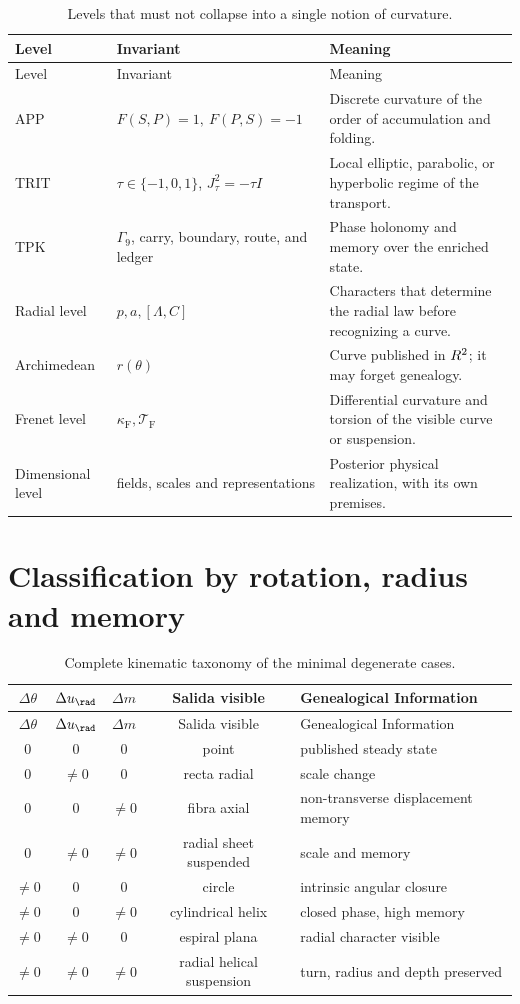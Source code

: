 \begin{longtable}{p{}p{}p{}}
\caption{Levels that must not collapse into a single notion of curvature.}
\label{espiral:tab:niveles-curvatura}\\
\toprule
Level&Invariant&Meaning\\
\midrule
\endfirsthead
\toprule
Level&Invariant&Meaning\\
\midrule
\endhead
APP&\(F(S,P)=1,\ F(P,S)=-1\)&Discrete curvature of the order of accumulation
and folding.\\
TRIT&\(\tau\in\{-1,0,1\}\), \(J_\tau^2=-\tau I\)&Local elliptic,
parabolic, or hyperbolic regime of the transport.\\
TPK&\(\Gamma_9\), carry, boundary, route, and ledger&Phase holonomy and
memory over the enriched state.\\
Radial level&\(p,a,[\Lambda,C]\)&Characters that determine the radial law before recognizing a curve.\\
Archimedean&\(r(\theta)\)&Curve published in \(R^2\); it may forget
genealogy.\\
Frenet level&\(\kappa_{\mathrm{F}},\mathcal T_{\mathrm{F}}\)&Differential curvature and torsion
of the visible curve or suspension.\\
Dimensional level&fields, scales and representations&Posterior physical realization,
with its own premises.\\
\bottomrule
\end{longtable}

\section{Classification by rotation, radius and memory}

\begin{longtable}{ccccl}
\caption{Complete kinematic taxonomy of the minimal degenerate cases.}
\label{espiral:tab:taxonomia-cinematica-ap}\\
\toprule
\(\Delta\theta\)&\(\Delta u_{\rad}\)&\(\Delta m\)&Salida visible&
Genealogical Information\\
\midrule
\endfirsthead
\toprule
\(\Delta\theta\)&\(\Delta u_{\rad}\)&\(\Delta m\)&Salida visible&
Genealogical Information\\
\midrule
\endhead
\(0\)&\(0\)&\(0\)&point&published steady state\\
\(0\)&\(\neq0\)&\(0\)&recta radial&scale change\\
\(0\)&\(0\)&\(\neq0\)&fibra axial&non-transverse displacement memory\\
\(0\)&\(\neq0\)&\(\neq0\)&radial sheet suspended&scale and memory\\
\(\neq0\)&\(0\)&\(0\)&circle&intrinsic angular closure\\
\(\neq0\)&\(0\)&\(\neq0\)&cylindrical helix&closed phase, high memory\\
\(\neq0\)&\(\neq0\)&\(0\)&espiral plana&radial character visible\\
\(\neq0\)&\(\neq0\)&\(\neq0\)&radial helical suspension&turn, radius and
depth preserved\\
\bottomrule
\end{longtable}

